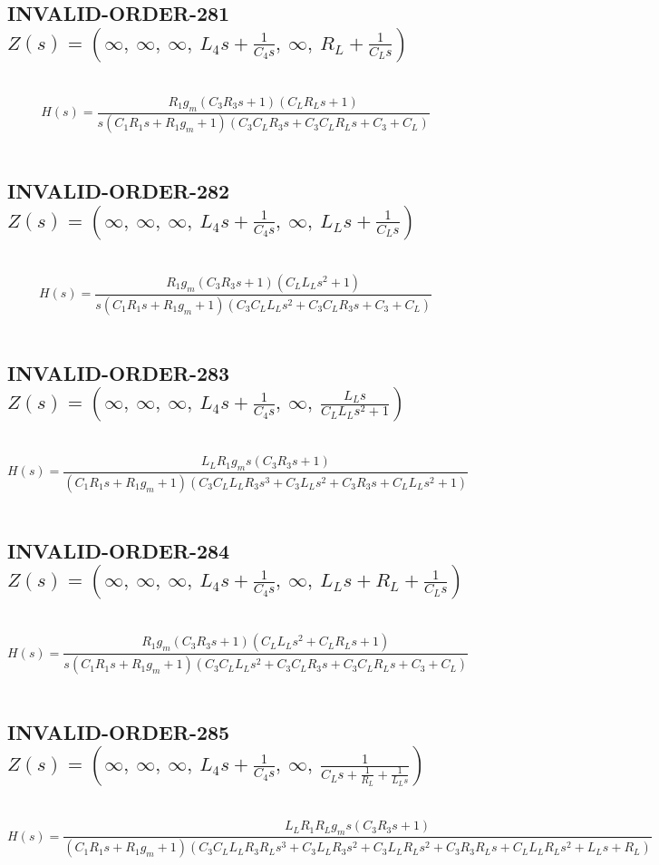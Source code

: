 \documentclass{article}
\begin{document}
\subsection{INVALID-ORDER-281 $Z(s) = \left( \infty, \  \infty, \  \infty, \  L_{4} s + \frac{1}{C_{4} s}, \  \infty, \  R_{L} + \frac{1}{C_{L} s}\right)$ } \ 
\textbf{\[H(s) = \frac{R_{1} g_{m} \left(C_{3} R_{3} s + 1\right) \left(C_{L} R_{L} s + 1\right)}{s \left(C_{1} R_{1} s + R_{1} g_{m} + 1\right) \left(C_{3} C_{L} R_{3} s + C_{3} C_{L} R_{L} s + C_{3} + C_{L}\right)}\] } \ 
\subsection{INVALID-ORDER-282 $Z(s) = \left( \infty, \  \infty, \  \infty, \  L_{4} s + \frac{1}{C_{4} s}, \  \infty, \  L_{L} s + \frac{1}{C_{L} s}\right)$ } \ 
\textbf{\[H(s) = \frac{R_{1} g_{m} \left(C_{3} R_{3} s + 1\right) \left(C_{L} L_{L} s^{2} + 1\right)}{s \left(C_{1} R_{1} s + R_{1} g_{m} + 1\right) \left(C_{3} C_{L} L_{L} s^{2} + C_{3} C_{L} R_{3} s + C_{3} + C_{L}\right)}\] } \ 
\subsection{INVALID-ORDER-283 $Z(s) = \left( \infty, \  \infty, \  \infty, \  L_{4} s + \frac{1}{C_{4} s}, \  \infty, \  \frac{L_{L} s}{C_{L} L_{L} s^{2} + 1}\right)$ } \ 
\textbf{\[H(s) = \frac{L_{L} R_{1} g_{m} s \left(C_{3} R_{3} s + 1\right)}{\left(C_{1} R_{1} s + R_{1} g_{m} + 1\right) \left(C_{3} C_{L} L_{L} R_{3} s^{3} + C_{3} L_{L} s^{2} + C_{3} R_{3} s + C_{L} L_{L} s^{2} + 1\right)}\] } \ 
\subsection{INVALID-ORDER-284 $Z(s) = \left( \infty, \  \infty, \  \infty, \  L_{4} s + \frac{1}{C_{4} s}, \  \infty, \  L_{L} s + R_{L} + \frac{1}{C_{L} s}\right)$ } \ 
\textbf{\[H(s) = \frac{R_{1} g_{m} \left(C_{3} R_{3} s + 1\right) \left(C_{L} L_{L} s^{2} + C_{L} R_{L} s + 1\right)}{s \left(C_{1} R_{1} s + R_{1} g_{m} + 1\right) \left(C_{3} C_{L} L_{L} s^{2} + C_{3} C_{L} R_{3} s + C_{3} C_{L} R_{L} s + C_{3} + C_{L}\right)}\] } \ 
\subsection{INVALID-ORDER-285 $Z(s) = \left( \infty, \  \infty, \  \infty, \  L_{4} s + \frac{1}{C_{4} s}, \  \infty, \  \frac{1}{C_{L} s + \frac{1}{R_{L}} + \frac{1}{L_{L} s}}\right)$ } \ 
\textbf{\[H(s) = \frac{L_{L} R_{1} R_{L} g_{m} s \left(C_{3} R_{3} s + 1\right)}{\left(C_{1} R_{1} s + R_{1} g_{m} + 1\right) \left(C_{3} C_{L} L_{L} R_{3} R_{L} s^{3} + C_{3} L_{L} R_{3} s^{2} + C_{3} L_{L} R_{L} s^{2} + C_{3} R_{3} R_{L} s + C_{L} L_{L} R_{L} s^{2} + L_{L} s + R_{L}\right)}\] } \ 
\end{document}
